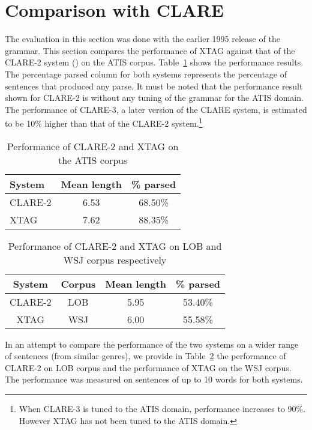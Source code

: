 
\section{Comparison with CLARE}

The evaluation in this section was done with the earlier 1995 release
of the grammar. This section compares the performance of XTAG against
that of the CLARE-2 system (\cite{clare-report92}) on the ATIS corpus.
Table~\ref{clare-results} shows the performance results. The
percentage parsed column for both systems represents the percentage of
sentences that produced any parse.  It must be noted that the
performance result shown for CLARE-2 is without any tuning of the
grammar for the ATIS domain. The performance of CLARE-3, a later
version of the CLARE system, is estimated to be 10\% higher than that
of the CLARE-2 system.\footnote{When CLARE-3 is tuned to the ATIS
  domain, performance increases to 90\%. However XTAG has not been
  tuned to the ATIS domain.}

\begin{table}[ht]
\centering
\begin{tabular}{|l|c|c|}  \hline
System & Mean length & \% parsed \\ \hline
CLARE-2  & 6.53 & 68.50\% \\ \hline
XTAG  & 7.62 & 88.35\% \\ \hline
\end{tabular}
\caption{Performance of CLARE-2 and XTAG on the ATIS corpus}
\label{clare-results}
\end{table}

\begin{table}[ht]
\centering
\begin{tabular}{|c|c|c|c|}  \hline
System & Corpus & Mean length & \% parsed \\ \hline
CLARE-2 & LOB & 5.95 & 53.40\% \\ \hline
XTAG & WSJ & 6.00 & 55.58\% \\ \hline
\end{tabular}
\caption{Performance of CLARE-2 and XTAG on LOB and WSJ corpus
respectively}
\label{clare-results1}
\end{table}


In an attempt to compare the performance of the two systems on a wider
range of sentences (from similar genres), we provide in
Table~\ref{clare-results1} the performance of CLARE-2 on LOB corpus
and the performance of XTAG on the WSJ corpus. The performance was
measured on sentences of up to 10 words for both systems.

